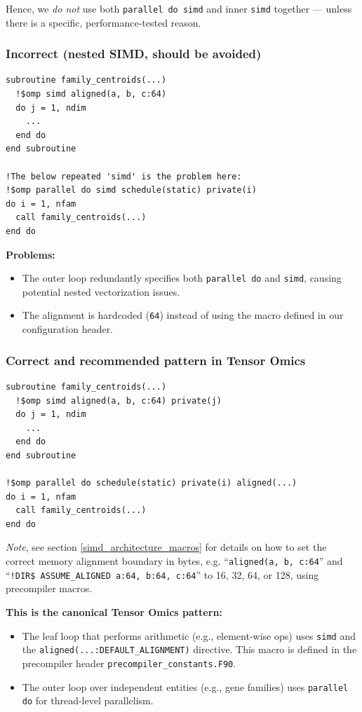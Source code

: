 \documentclass{article}
\begin{document}
Hence, we \emph{do not} use both \texttt{parallel do simd} and inner \texttt{simd} together — unless there is a specific, performance-tested reason.

\subsubsection{Incorrect (nested SIMD, should be avoided)}

\begin{verbatim}
subroutine family_centroids(...)
  !$omp simd aligned(a, b, c:64)
  do j = 1, ndim
    ...
  end do
end subroutine

!The below repeated 'simd' is the problem here:
!$omp parallel do simd schedule(static) private(i)
do i = 1, nfam
  call family_centroids(...)
end do
\end{verbatim}

\textbf{Problems:}
\begin{itemize}
\item The outer loop redundantly specifies both \texttt{parallel do} and \texttt{simd}, causing potential nested vectorization issues.
\item The alignment is hardcoded (\texttt{64}) instead of using the macro defined in our configuration header.
\end{itemize}

\subsubsection{Correct and recommended pattern in Tensor Omics}

\begin{verbatim}
subroutine family_centroids(...)
  !$omp simd aligned(a, b, c:64) private(j)
  do j = 1, ndim
    ...
  end do
end subroutine

!$omp parallel do schedule(static) private(i) aligned(...)
do i = 1, nfam
  call family_centroids(...)
end do
\end{verbatim}

\emph{Note}, see section \ref{simd_architecture_macros} for details on how to
set the correct memory alignment boundary in bytes, e.g. ``\texttt{aligned(a,
b, c:64}'' and ``\texttt{!DIR\$ ASSUME\_ALIGNED a:64, b:64, c:64}'' to 16, 32,
64, or 128, using precompiler macros.

\textbf{This is the canonical Tensor Omics pattern:}
\begin{itemize}
\item The leaf loop that performs arithmetic (e.g., element-wise ops) uses \texttt{simd} and the \texttt{aligned(...:DEFAULT\_ALIGNMENT)} directive. This macro is defined in the precompiler header \texttt{precompiler\_constants.F90}.
\item The outer loop over independent entities (e.g., gene families) uses \texttt{parallel do} for thread-level parallelism.
\end{itemize}
\end{document}

